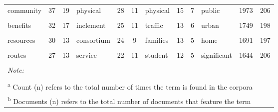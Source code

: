 \documentclass[]{elsarticle} %
\begin{document}
\begin{table}
{\begin{tabular}[t]{lcclcclcclcc}
community & 37 & 19 & physical & 28 & 11 & physical & 15 & 7 & public & 1973 & 206\\
\cellcolor{gray!6}{safe} & \cellcolor{gray!6}{34} & \cellcolor{gray!6}{16} & \cellcolor{gray!6}{health} & \cellcolor{gray!6}{28} & \cellcolor{gray!6}{11} & \cellcolor{gray!6}{healthy} & \cellcolor{gray!6}{14} & \cellcolor{gray!6}{6} & \cellcolor{gray!6}{age} & \cellcolor{gray!6}{1774} & \cellcolor{gray!6}{209}\\
benefits & 32 & 17 & inclement & 25 & 11 & traffic & 13 & 6 & urban & 1749 & 198\\
\addlinespace
\cellcolor{gray!6}{play} & \cellcolor{gray!6}{31} & \cellcolor{gray!6}{2} & \cellcolor{gray!6}{eligibility} & \cellcolor{gray!6}{24} & \cellcolor{gray!6}{11} & \cellcolor{gray!6}{support} & \cellcolor{gray!6}{13} & \cellcolor{gray!6}{6} & \cellcolor{gray!6}{different} & \cellcolor{gray!6}{1695} & \cellcolor{gray!6}{213}\\
resources & 30 & 13 & consortium & 24 & 9 & families & 13 & 5 & home & 1691 & 197\\
\cellcolor{gray!6}{healthy} & \cellcolor{gray!6}{29} & \cellcolor{gray!6}{16} & \cellcolor{gray!6}{region} & \cellcolor{gray!6}{23} & \cellcolor{gray!6}{10} & \cellcolor{gray!6}{way} & \cellcolor{gray!6}{12} & \cellcolor{gray!6}{5} & \cellcolor{gray!6}{social} & \cellcolor{gray!6}{1672} & \cellcolor{gray!6}{189}\\
routes & 27 & 13 & service & 22 & 11 & student & 12 & 5 & significant & 1644 & 206\\
\cellcolor{gray!6}{lanes} & \cellcolor{gray!6}{26} & \cellcolor{gray!6}{3} & \cellcolor{gray!6}{•} & \cellcolor{gray!6}{21} & \cellcolor{gray!6}{1} & \cellcolor{gray!6}{region} & \cellcolor{gray!6}{12} & \cellcolor{gray!6}{4} & \cellcolor{gray!6}{mobility} & \cellcolor{gray!6}{1634} & \cellcolor{gray!6}{136}\\
\bottomrule
\multicolumn{12}{l}{\rule{0pt}{1em}\textit{Note: }}\\
\multicolumn{12}{l}{\rule{0pt}{1em} }\\
\multicolumn{12}{l}{\rule{0pt}{1em}\textsuperscript{a} Count (n) refers to the total number of times the term is found in the corpora}\\
\multicolumn{12}{l}{\rule{0pt}{1em}\textsuperscript{b} Documents (n) refers to the total number of documents that feature the term}\\
\end{tabular}}
\end{table}
\end{document}
